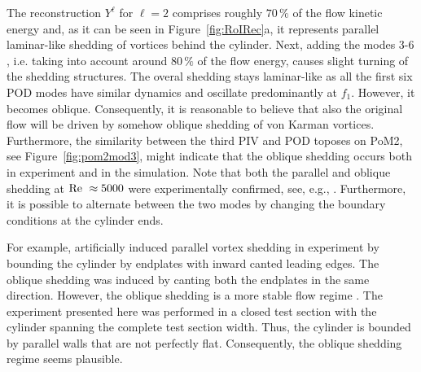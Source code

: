 {{{{%
The reconstruction $Y^{\ell}$ for $\ell = 2$ comprises roughly $70\,\%$ of the flow kinetic energy and, as it can be seen in Figure~\ref{fig:RoIRec}a, it represents parallel laminar-like shedding of vortices behind the cylinder. Next, adding the modes $3$-$6$, i.e. taking into account around $80\,\%$ of the flow energy, causes slight turning of the shedding structures. The overal shedding stays laminar-like as all the first six POD modes have similar dynamics and oscillate predominantly at $f_{1}$. However, it becomes oblique. Consequently, it is reasonable to believe that also the original flow will be driven by somehow oblique shedding of von Karman vortices. Furthermore, the similarity between the third PIV and POD toposes on PoM2, see Figure~\ref{fig:pom2mod3}, might indicate that the oblique shedding occurs both in experiment and in the simulation. Note that both the parallel and oblique shedding at $\mathrm{Re}~\approx{5000}$ were experimentally confirmed, see, e.g., \citep{williamson1996,prasad1997}. Furthermore, it is possible to alternate between the two modes by changing the boundary conditions at the cylinder ends. %

For example, \citet{prasad1997} artificially induced parallel vortex shedding in experiment by bounding the cylinder by endplates with inward canted leading edges. The oblique shedding was induced by canting both the endplates in the same direction. However, the oblique shedding is a more stable flow regime \cite{williamson1989}. The experiment presented here was performed in a closed test section with the cylinder spanning the complete test section width. Thus, the cylinder is bounded by parallel walls that are not perfectly flat. Consequently, the oblique shedding regime seems plausible.

}}}}
